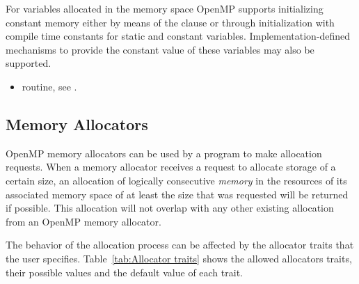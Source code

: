 \linenumbers

\begin{note}
For variables allocated in the  memory space OpenMP 
supports initializing constant memory either by means of the  
clause or through initialization with compile time constants for static and 
constant variables. Implementation-defined mechanisms to provide the constant 
value of these variables may also be supported.
 \end{note}


\crossreferences
\begin{itemize}
\item {} routine, see .
\end{itemize}

\subsection{Memory Allocators}
\label{subsec:Memory Allocators}

OpenMP memory allocators can be used by a program to make allocation requests. 
When a memory allocator receives a request to allocate storage of a certain size, 
an allocation of logically consecutive \emph{memory} in the resources of its 
associated memory space of at least the size that was requested will be returned
if possible. This allocation will not overlap with any other existing allocation 
from an OpenMP memory allocator. 

The behavior of the allocation process can be affected by the allocator traits 
that the user specifies. Table~\ref{tab:Allocator traits} shows the allowed allocators 
traits, their possible values and the default value of each trait.

